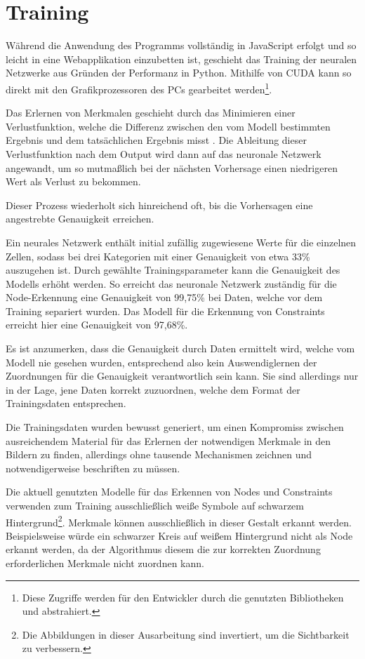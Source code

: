 \section{Training}
Während die Anwendung des Programms vollständig in JavaScript erfolgt und so leicht in eine Webapplikation einzubetten ist, geschieht das Training der neuralen Netzwerke aus Gründen der Performanz in Python.
Mithilfe von CUDA \cite{nvidia2019} kann so direkt mit den Grafikprozessoren des PCs gearbeitet werden\footnote{Diese Zugriffe werden für den Entwickler durch die genutzten Bibliotheken  und  abstrahiert.}.

Das Erlernen von Merkmalen geschieht durch das Minimieren einer Verlustfunktion, welche die Differenz zwischen den vom Modell bestimmten Ergebnis und dem tatsächlichen Ergebnis misst \cite[S.710]{StuartRussell2018}.
Die Ableitung dieser Verlustfunktion nach dem Output wird dann auf das neuronale Netzwerk angewandt, um so mutma{\ss}lich bei der nächsten Vorhersage einen niedrigeren Wert als Verlust zu bekommen.

Dieser Prozess wiederholt sich hinreichend oft, bis die Vorhersagen eine angestrebte Genauigkeit erreichen.

Ein neurales Netzwerk enthält initial zufällig zugewiesene Werte für die einzelnen Zellen, sodass bei drei Kategorien mit einer Genauigkeit von etwa 33\% auszugehen ist.
Durch gewählte Trainingsparameter kann die Genauigkeit des Modells erhöht werden.
So erreicht das neuronale Netzwerk zuständig für die Node-Erkennung eine Genauigkeit von 99,75\% bei Daten, welche vor dem Training separiert wurden.
Das Modell für die Erkennung von Constraints erreicht hier eine Genauigkeit von 97,68\%.

Es ist anzumerken, dass die Genauigkeit durch Daten ermittelt wird, welche vom Modell nie gesehen wurden, entsprechend also kein Auswendiglernen der Zuordnungen \cite[S.705]{StuartRussell2018} für die Genauigkeit verantwortlich sein kann.
Sie sind allerdings nur in der Lage, jene Daten korrekt zuzuordnen, welche dem Format der Trainingsdaten entsprechen.

Die Trainingsdaten wurden bewusst generiert, um einen Kompromiss zwischen ausreichendem Material für das Erlernen der notwendigen Merkmale in den Bildern zu finden, allerdings ohne tausende Mechanismen zeichnen und notwendigerweise beschriften zu müssen.

Die aktuell genutzten Modelle für das Erkennen von Nodes und Constraints verwenden zum Training ausschlie{\ss}lich wei{\ss}e Symbole auf schwarzem Hintergrund\footnote{Die Abbildungen in dieser Ausarbeitung sind invertiert, um die Sichtbarkeit zu verbessern.}.
Merkmale können ausschlie{\ss}lich in dieser Gestalt erkannt werden. Beispielsweise würde ein schwarzer Kreis auf wei{\ss}em Hintergrund nicht als Node erkannt werden, da der Algorithmus diesem die zur korrekten Zuordnung erforderlichen Merkmale nicht zuordnen kann.

